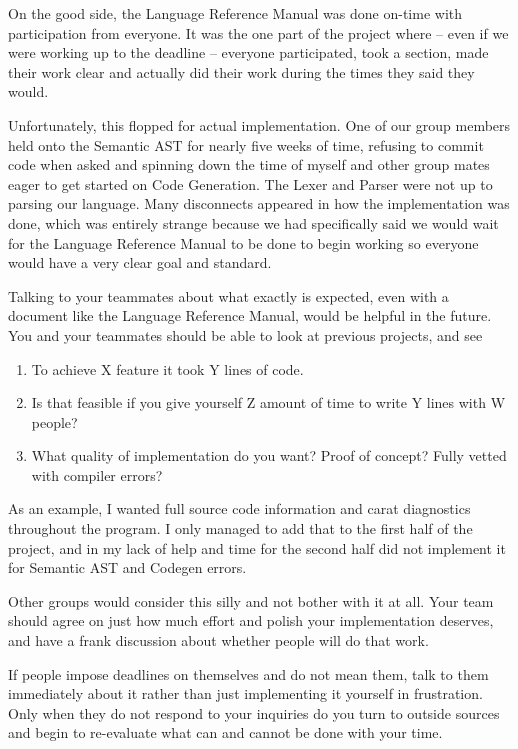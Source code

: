 On the good side, the Language Reference Manual was done on-time with participation from everyone. It was the one part of the project where -- even if we were working up to the deadline -- everyone participated, took a section, made their work clear and actually did their work during the times they said they would.

Unfortunately, this flopped for actual implementation. One of our group members held onto the Semantic AST for nearly five weeks of time, refusing to commit code when asked and spinning down the time of myself and other group mates eager to get started on Code Generation. The Lexer and Parser were not up to parsing our language. Many disconnects appeared in how the implementation was done, which was entirely strange because we had specifically said we would wait for the Language Reference Manual to be done to begin working so everyone would have a very clear goal and standard. 

Talking to your teammates about what exactly is expected, even with a document like the Language Reference Manual, would be helpful in the future. You and your teammates should be able to look at previous projects, and see

\begin{enumerate}
	\item To achieve X feature it took Y lines of code.
	\item Is that feasible if you give yourself Z amount of time to write Y lines with W people?
	\item What quality of implementation do you want? Proof of concept? Fully vetted with compiler errors?
\end{enumerate}

As an example, I wanted full source code information and carat diagnostics throughout the program. I only managed to add that to the first half of the project, and in my lack of help and time for the second half did not implement it for Semantic AST and Codegen errors.

Other groups would consider this silly and not bother with it at all. Your team should agree on just how much effort and polish your implementation deserves, and have a frank discussion about whether people will do that work.

If people impose deadlines on themselves and do not mean them, talk to them immediately about it rather than just implementing it yourself in frustration. Only when they do not respond to your inquiries do you turn to outside sources and begin to re-evaluate what can and cannot be done with your time.

